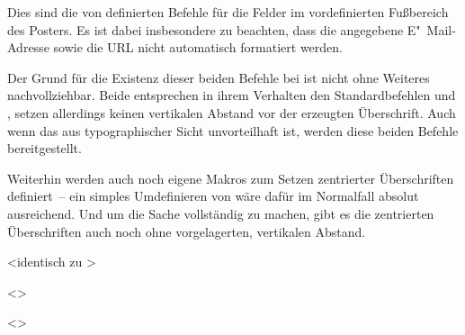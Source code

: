 \begin{DeclareEntity}{}
\begin{Declaration}
\begin{Declaration}
\begin{Declaration}
\begin{Declaration}
Dies sind die von  definierten Befehle für die Felder im 
vordefinierten Fußbereich des Posters. Es ist dabei insbesondere zu beachten, 
dass die angegebene E"~Mail-Adresse sowie die URL nicht automatisch formatiert 
werden.
\end{Declaration}
\end{Declaration}
\end{Declaration}
\end{Declaration}

\begin{Declaration}
  {}
\begin{Declaration}
  {}
\printdeclarationlist

Der Grund für die Existenz dieser beiden Befehle bei  ist 
nicht ohne Weiteres nachvollziehbar. Beide entsprechen in ihrem Verhalten den 
Standardbefehlen  und , setzen allerdings 
keinen vertikalen Abstand vor der erzeugten Überschrift. Auch wenn das aus 
typographischer Sicht unvorteilhaft ist, werden diese beiden Befehle 
bereitgestellt.
\end{Declaration}
\end{Declaration}

\begin{Declaration}
  {}
\begin{Declaration}
  {}
\begin{Declaration}
  {}
\begin{Declaration}
  {}
\printdeclarationlist

Weiterhin werden auch noch eigene Makros zum Setzen zentrierter Überschriften 
definiert~-- ein simples Umdefinieren von  wäre dafür im 
Normalfall absolut ausreichend. Und um die Sache vollständig zu machen, gibt es 
die zentrierten Überschriften auch noch ohne vorgelagerten, vertikalen Abstand.
\end{Declaration}
\end{Declaration}
\end{Declaration}
\end{Declaration}

\begin{Declaration}
  {}
  <identisch zu >
\begin{Declaration}
  {}
  <>
\begin{Declaration}
  {}
  <>
\printdeclarationlist


\end{Declaration}
\end{Declaration}
\end{Declaration}
\end{DeclareEntity}
